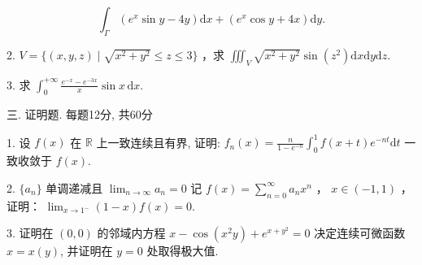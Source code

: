 \documentclass{examcollection}
\renewcommand{\displayformula}[1]{\[#1\]}
\begin{document}
{\begin{minipage}{\textwidth}
\displayformula{\int_ {\Gamma} \left(e ^ {x} \sin y - 4 y\right) \mathrm{d} x + \left(e ^ {x} \cos y + 4 x\right) \mathrm{d} y.}\par
2. $V = \{(x,y,z)\mid \sqrt{x^2 + y^2}\leq z\leq 3\}$ ，求 $\iiint_{V}\sqrt{x^2 + y^2}\sin (z^2)\mathrm{d}x\mathrm{d}y\mathrm{d}z.$\par
3. 求 $\int_0^{+\infty} \frac{e^{-x} - e^{-3x}}{x} \sin x \, \mathrm{d}x$.\par
三. 证明题. 每题12分, 共60分\par
1. 设 $f(x)$ 在 $\mathbb{R}$ 上一致连续且有界, 证明: $f_{n}(x) = \frac{n}{1 - e^{-n}} \int_{0}^{1} f(x + t) e^{-nt} \mathrm{d}t$ 一致收敛于 $f(x)$.\par
2. $\{a_{n}\}$ 单调递减且 $\lim_{n\to \infty}a_n = 0$ 记 $f(x) = \sum_{n = 0}^{\infty}a_nx^n$ ， $x\in (-1,1)$ ，证明： $\lim_{x\to 1^{-}}(1 - x)f(x) = 0.$\par
3. 证明在 $(0,0)$ 的邻域内方程 $x - \cos (x^2 y) + e^{x + y^2} = 0$ 决定连续可微函数 $x = x(y)$, 并证明在 $y = 0$ 处取得极大值.\par
\end{minipage}}
\ifdim\dimexpr\ht\proofbox+\dp\proofbox\relax>\textheight
\noindent\resizebox{!}{\textheight}{\usebox{\proofbox}}\else\noindent\usebox{\proofbox}\fi\clearpage
\end{document}
